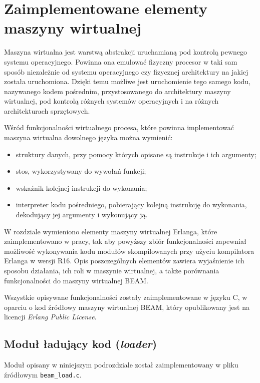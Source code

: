 \chapter{Zaimplementowane elementy maszyny wirtualnej}
\label{cha:maszyna}

Maszyna wirtualna jest warstwą abstrakcji uruchamianą pod kontrolą pewnego systemu operacyjnego.
Powinna ona emulować fizyczny procesor w taki sam sposób niezależnie od systemu operacyjnego czy fizycznej architektury na jakiej została uruchomiona.
Dzięki temu możliwe jest uruchomienie tego samego kodu, nazywanego kodem pośrednim, przystosowanego do architektury maszyny wirtualnej, pod kontrolą różnych systemów operacyjnych i na różnych architekturach sprzętowych.

Wśród funkcjonalności wirtualnego procesa, które powinna implementować maszyna wirtualna dowolnego języka można wymienić:
\begin{itemize}
\item struktury danych, przy pomocy których opisane są instrukcje i ich argumenty;
\item stos, wykorzystywany do wywołań funkcji;
\item wskaźnik kolejnej instrukcji do wykonania;
\item interpreter kodu pośredniego, pobierający kolejną instrukcję do wykonania, dekodujący jej argumenty i wykonujący ją.
\end{itemize}

W rozdziale wymieniono elementy maszyny wirtualnej Erlanga, które zaimplementowano w pracy, tak aby powyższy zbiór funkcjonalności zapewniał możliwość wykonywania kodu modułów skompilowanych przy użyciu kompilatora Erlanga w wersji R16.
Opis poszczególnych elementów zawiera wyjaśnienie ich sposobu działania, ich roli w maszynie wirtualnej, a także porównania
funkcjonalności do maszyny wirtualnej BEAM.

Wszystkie opisywane funkcjonalności zostały zaimplementowane w języku C, w oparciu o kod źródłowy maszyny wirtualnej BEAM, który opublikowany jest na licencji \emph{Erlang Public License}.

\section{Moduł ładujący kod (\emph{loader})}
\label{sec:maszynaLoader}

Moduł opisany w niniejszym podrozdziale został zaimplementowany w pliku źródłowym \texttt{beam\_load.c}.

